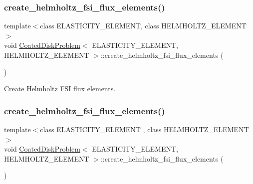 \subsubsection{\texorpdfstring{create\+\_\+helmholtz\+\_\+fsi\+\_\+flux\+\_\+elements()}{create\_helmholtz\_fsi\_flux\_elements()}\hspace{0.1cm}{\footnotesize\ttfamily [1/2]}}
{\footnotesize\ttfamily template$<$class E\+L\+A\+S\+T\+I\+C\+I\+T\+Y\+\_\+\+E\+L\+E\+M\+E\+NT, class H\+E\+L\+M\+H\+O\+L\+T\+Z\+\_\+\+E\+L\+E\+M\+E\+NT$>$ \\
void \hyperlink{classCoatedDiskProblem}{Coated\+Disk\+Problem}$<$ E\+L\+A\+S\+T\+I\+C\+I\+T\+Y\+\_\+\+E\+L\+E\+M\+E\+NT, H\+E\+L\+M\+H\+O\+L\+T\+Z\+\_\+\+E\+L\+E\+M\+E\+NT $>$\+::create\+\_\+helmholtz\+\_\+fsi\+\_\+flux\+\_\+elements (\begin{DoxyParamCaption}{ }\end{DoxyParamCaption})\hspace{0.3cm}{\ttfamily [private]}}



Create Helmholtz F\+SI flux elements. 

\mbox{\label{classCoatedDiskProblem_a34f61c03b152f2ac06e1e771b0dbe09b}} 
\subsubsection{\texorpdfstring{create\+\_\+helmholtz\+\_\+fsi\+\_\+flux\+\_\+elements()}{create\_helmholtz\_fsi\_flux\_elements()}\hspace{0.1cm}{\footnotesize\ttfamily [2/2]}}
{\footnotesize\ttfamily template$<$class E\+L\+A\+S\+T\+I\+C\+I\+T\+Y\+\_\+\+E\+L\+E\+M\+E\+NT , class H\+E\+L\+M\+H\+O\+L\+T\+Z\+\_\+\+E\+L\+E\+M\+E\+NT $>$ \\
void \hyperlink{classCoatedDiskProblem}{Coated\+Disk\+Problem}$<$ E\+L\+A\+S\+T\+I\+C\+I\+T\+Y\+\_\+\+E\+L\+E\+M\+E\+NT, H\+E\+L\+M\+H\+O\+L\+T\+Z\+\_\+\+E\+L\+E\+M\+E\+NT $>$\+::create\+\_\+helmholtz\+\_\+fsi\+\_\+flux\+\_\+elements (\begin{DoxyParamCaption}{ }\end{DoxyParamCaption})\hspace{0.3cm}{\ttfamily [private]}}



